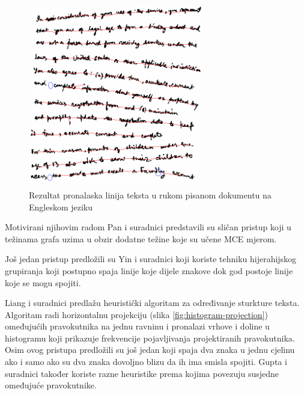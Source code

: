 \documentclass[times, utf8, zavrsni]{fer}
\begin{document}
\begin{figure}[htb]
    \centering
    \captionsetup{justification=centering,margin=2cm}
    \includegraphics[height=8cm]{images/mst-example-01.png}
    \caption{Rezultat pronalaska linija teksta u rukom pisanom dokumentu na Engleskom jeziku \citep{yin2007handwritten}}
    \label{fig:mst-example-01}
\end{figure}

Motivirani njihovim radom Pan i suradnici \citep{pan2011hybrid} predstavili su sličan pristup
koji u težinama grafa uzima u obzir dodatne težine koje su učene MCE  mjerom.

Još jedan pristup predložili su Yin i suradnici \citep{DBLP:journals/corr/abs-1301-2628} koji koriste
tehniku hijerahijskog grupiranja koji postupno spaja linije koje dijele znakove dok god
postoje linije koje se mogu spojiti. \citep{DBLP:journals/corr/TianPHLYT16}

Liang i suradnici \citep{liang1996document} predlažu heuristički algoritam za određivanje sturkture
teksta. Algoritam radi horizontalnu projekciju (slika \ref{fig:histogram-projection}) omeđujućih pravokutnika na jednu ravninu i pronalazi
vrhove i doline u histogramu koji prikazuje frekvencije pojavljivanja projektiranih pravokutnika.
Osim ovog pristupa predložili su još jedan koji spaja dva znaka u jednu cjelinu ako i samo ako
su dva znaka dovoljno blizu da ih ima smisla spojiti. Gupta i suradnici \citep{gupta2006document} također koriste razne heuristike prema kojima
povezuju susjedne omeđujuće pravokutnike.

\pagebreak
\end{document}
